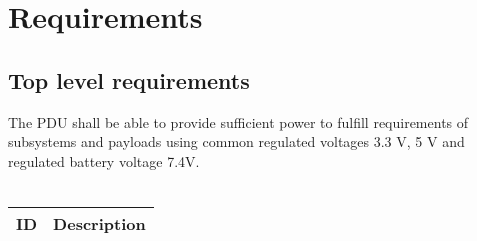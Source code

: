 \chapter{Requirements\label{cha:chapter3}}

\section{Top level requirements}
The PDU shall be able to provide sufficient power to fulfill requirements of subsystems and payloads using common regulated voltages 3.3 V, 5 V and regulated battery voltage 7.4V.   \\ \\

\begin{tabular}{p{1cm}p{15cm}} \toprule
	ID & Description \\ \midrule
	

	


\end{tabular}

